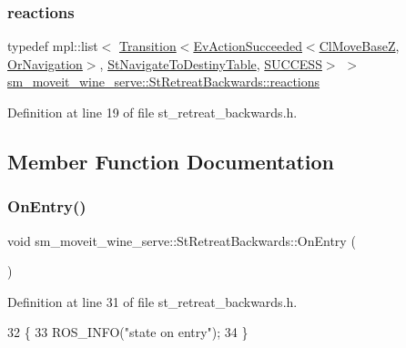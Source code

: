 \subsubsection{\texorpdfstring{reactions}{reactions}}
{\footnotesize\ttfamily typedef mpl\+::list$<$ \hyperlink{classsmacc_1_1Transition}{Transition}$<$\hyperlink{structsmacc_1_1default__events_1_1EvActionSucceeded}{Ev\+Action\+Succeeded}$<$\hyperlink{classcl__move__base__z_1_1ClMoveBaseZ}{Cl\+Move\+BaseZ}, \hyperlink{classsm__moveit__wine__serve_1_1OrNavigation}{Or\+Navigation}$>$, \hyperlink{structsm__moveit__wine__serve_1_1StNavigateToDestinyTable}{St\+Navigate\+To\+Destiny\+Table}, \hyperlink{structsmacc_1_1default__transition__tags_1_1SUCCESS}{S\+U\+C\+C\+E\+SS}$>$ $>$ \hyperlink{structsm__moveit__wine__serve_1_1StRetreatBackwards_a052e88b7875186070d76603bd1051aa9}{sm\+\_\+moveit\+\_\+wine\+\_\+serve\+::\+St\+Retreat\+Backwards\+::reactions}}



Definition at line 19 of file st\+\_\+retreat\+\_\+backwards.\+h.



\subsection{Member Function Documentation}
\mbox{\label{structsm__moveit__wine__serve_1_1StRetreatBackwards_aa4d29a4b621baec82f6c23bbc9970381}} 
\subsubsection{\texorpdfstring{On\+Entry()}{OnEntry()}}
{\footnotesize\ttfamily void sm\+\_\+moveit\+\_\+wine\+\_\+serve\+::\+St\+Retreat\+Backwards\+::\+On\+Entry (\begin{DoxyParamCaption}{ }\end{DoxyParamCaption})\hspace{0.3cm}{\ttfamily [inline]}}



Definition at line 31 of file st\+\_\+retreat\+\_\+backwards.\+h.


\begin{DoxyCode}
32         \{
33             ROS\_INFO(\textcolor{stringliteral}{"state on entry"});
34         \}
\end{DoxyCode}
\mbox{\label{structsm__moveit__wine__serve_1_1StRetreatBackwards_a368c6d3b3633a8c2b6e9b95ff1b580bf}} 
